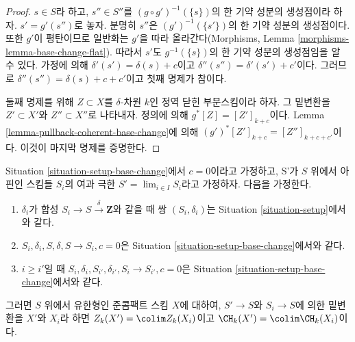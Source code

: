 \begin{proof}
$s \in S$라 하고, $s'' \in S''$를
$(g \circ g')^{-1}(\{s\})$의 한 기약 성분의 생성점이라 하자.
$s' = g'(s'')$로 놓자. 분명히 $s''$은
$(g')^{-1}(\{s'\})$의 한 기약 성분의 생성점이다. 또한 $g'$이
평탄이므로 일반화는 $g'$을 따라 올라간다(Morphisms, Lemma
\ref{morphisms-lemma-base-change-flat}). 따라서 $s'$도
$g^{-1}(\{s\})$의 한 기약 성분의 생성점임을 알 수 있다. 가정에
의해 $\delta'(s') = \delta(s) + c$이고
$\delta''(s'') = \delta'(s') + c'$이다. 그러므로
$\delta''(s'') = \delta(s) + c + c'$이고 첫째 명제가 참이다.

\medskip\noindent
둘째 명제를 위해 $Z \subset X$를 $\delta$-차원 $k$인 정역 닫힌
부분스킴이라 하자. 그 밑변환을 $Z' \subset X'$와
$Z'' \subset X''$로 나타내자. 정의에 의해
$g^*[Z] = [Z']_{k + c}$이다. Lemma
\ref{lemma-pullback-coherent-base-change}에 의해
$(g')^*[Z']_{k + c} = [Z'']_{k + c + c'}$이다. 이것이 마지막 명제를
증명한다.
\end{proof}

\begin{lemma}
\label{lemma-chow-limit}
Situation \ref{situation-setup-base-change}에서 $c = 0$이라고 가정하고,
S'가 $S$ 위에서 아핀인 스킴들 $S_i$의 여과 극한
$S' = \lim_{i \in I} S_i$라고 가정하자. 다음을 가정한다.
\begin{enumerate}
\item $\delta_i$가 합성 $S_i \to S \xrightarrow{\delta} \mathbf{Z}$와
같을 때 쌍 $(S_i, \delta_i)$는 Situation
\ref{situation-setup}에서와 같다.
\item $S_i, \delta_i, S, \delta, S \to S_i, c = 0$은 Situation
\ref{situation-setup-base-change}에서와 같다.
\item $i \geq i'$일 때
$S_i, \delta_i, S_{i'}, \delta_{i'}, S_i \to S_{i'}, c = 0$은
Situation \ref{situation-setup-base-change}에서와 같다.
\end{enumerate}
그러면 $S$ 위에서 유한형인 준콤팩트 스킴 $X$에 대하여,
$S' \to S$와 $S_i \to S$에 의한 밑변환을 $X'$와 $X_i$라 하면
$Z_k(X') = \colim Z_k(X_i)$이고
$\CH_k(X') = \colim \CH_k(X_i)$이다.
\end{lemma}

